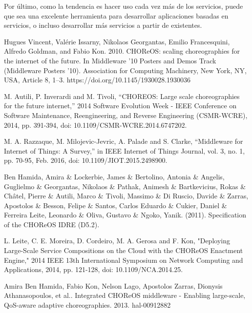 \documentclass[runningheads]{llncs}
\begin{document}
Por último, como la tendencia es hacer uso cada vez más de los servicios, puede que sea una excelente herramienta para desarrollar aplicaciones basadas en servicios, o incluso desarrollar más servicios a partir de existentes.

%
%
%
% 
% 
%
\begin{thebibliography}{8}
Hugues Vincent, Valérie Issarny, Nikolaos Georgantas, Emilio Francesquini, Alfredo Goldman, and Fabio Kon. 2010. CHOReOS: scaling choreographies for the internet of the future. In Middleware '10 Posters and Demos Track (Middleware Posters '10). Association for Computing Machinery, New York, NY, USA, Article 8, 1–3. https://doi.org/10.1145/1930028.1930036

M. Autili, P. Inverardi and M. Tivoli, ``CHOREOS: Large scale choreographies for the future internet,'' 2014 Software Evolution Week - IEEE Conference on Software Maintenance, Reengineering, and Reverse Engineering (CSMR-WCRE), 2014, pp. 391-394, doi: 10.1109/CSMR-WCRE.2014.6747202.

M. A. Razzaque, M. Milojevic-Jevric, A. Palade and S. Clarke, ``Middleware for Internet of Things: A Survey,'' in IEEE Internet of Things Journal, vol. 3, no. 1, pp. 70-95, Feb. 2016, doi: 10.1109/JIOT.2015.2498900.

Ben Hamida, Amira \& Lockerbie, James \& Bertolino, Antonia \& Angelis, Guglielmo \& Georgantas, Nikolaos \& Pathak, Animesh \& Bartkevicius, Rokas \& Châtel, Pierre \& Autili, Marco \& Tivoli, Massimo \& Di Ruscio, Davide \& Zarras, Apostolos \& Besson, Felipe \& Santos, Carlos Eduardo \& Cukier, Daniel \& Ferreira Leite, Leonardo \& Oliva, Gustavo \& Ngoko, Yanik. (2011). Specification of the CHOReOS IDRE (D5.2). 

L. Leite, C. E. Moreira, D. Cordeiro, M. A. Gerosa and F. Kon, "Deploying Large-Scale Service Compositions on the Cloud with the CHOReOS Enactment Engine," 2014 IEEE 13th International Symposium on Network Computing and Applications, 2014, pp. 121-128, doi: 10.1109/NCA.2014.25.


Amira Ben Hamida, Fabio Kon, Nelson Lago, Apostolos Zarras, Dionysis Athanasopoulos, et al.. Integrated CHOReOS middleware - Enabling large-scale, QoS-aware adaptive choreographies. 2013. hal-00912882

\end{thebibliography}
\end{document}
